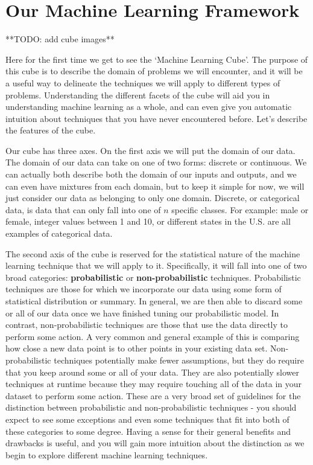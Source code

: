 \section{Our Machine Learning Framework}
**TODO: add cube images**

Here for the first time we get to see the `Machine Learning Cube'. The purpose of this cube is to describe the domain of problems we will encounter, and it will be a useful way to delineate the techniques we will apply to different types of problems. Understanding the different facets of the cube will aid you in understanding machine learning as a whole, and can even give you automatic intuition about techniques that you have never encountered before. Let's describe the features of the cube.

Our cube has three axes. On the first axis we will put the domain of our data. The domain of our data can take on one of two forms: discrete or continuous. We can actually both describe both the domain of our inputs and outputs, and we can even have mixtures from each domain, but to keep it simple for now, we will just consider our data as belonging to only one domain. Discrete, or categorical data, is data that can only fall into one of $n$ specific classes. For example: male or female, integer values between 1 and 10, or different states in the U.S. are all examples of categorical data.

The second axis of the cube is reserved for the statistical nature of the machine learning technique that we will apply to it. Specifically, it will fall into one of two broad categories: \textbf{probabilistic} or \textbf{non-probabilistic} techniques. Probabilistic techniques are those for which we incorporate our data using some form of statistical distribution or summary. In general, we are then able to discard some or all of our data once we have finished tuning our probabilistic model. In contrast, non-probabilistic techniques are those that use the data directly to perform some action. A very common and general example of this is comparing how close a new data point is to other points in your existing data set. Non-probabilistic techniques potentially make fewer assumptions, but they do require that you keep around some or all of your data. They are also potentially slower techniques at runtime because they may require touching all of the data in your dataset to perform some action. These are a very broad set of guidelines for the distinction between probabilistic and non-probabilistic techniques - you should expect to see some exceptions and even some techniques that fit into both of these categories to some degree. Having a sense for their general benefits and drawbacks is useful, and you will gain more intuition about the distinction as we begin to explore different machine learning techniques.

